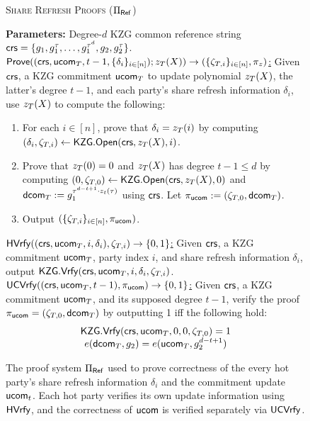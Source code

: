 \begin{figure*}[tb]
    \centering
    \begin{mdframed}
    \begin{center}
        \textsc{Share Refresh Proofs ($\Pi_{\sf Ref}$)}
    \end{center}
    \medskip
    \textbf{Parameters:} Degree-$d$ KZG common reference string $\mathsf{crs} = \{g_1, g_1^\tau, \dots, g_1^{\tau^d}, g_2, g_2^\tau\}$.
    \hfill\medskip\\
    \underline{$\mathsf{Prove}((\mathsf{crs}, {\sf u}\mathsf{com}_{T}, t-1, \{\delta_i\}_{i \in [n]}); z_{T}(X)) \to (\{\zeta_{T,i}\}_{i \in [n]}, \pi_z)$:} Given $\mathsf{crs}$, a KZG commitment ${\sf u}\mathsf{com}_{T}$ to update polynomial $z_{T}(X)$, the latter's degree $t-1$, and each party's share refresh information $\delta_i$, use $z_{T}(X)$ to compute the following:
    \begin{enumerate}
        \item For each $i \in [n]$, prove that $\delta_i = z_{T}(i)$ by computing $(\delta_i, \zeta_{T,i}) \gets \mathsf{KZG}.\mathsf{Open}(\mathsf{crs}, z_{T}(X), i)$. 
        \item Prove that $z_{T}(0) = 0$ and $z_{T}(X)$ has degree $t-1 \leq d$ by computing $(0, \zeta_{T,0}) \gets \mathsf{KZG}.\mathsf{Open}(\mathsf{crs}, z_{T}(X), 0)$ and $\mathsf{dcom}_{T} := g_1^{\tau^{d-t+1} \cdot z_t(\tau)}$ using $\mathsf{crs}$. Let $\pi_{\mathsf{ucom}} := (\zeta_{T,0}, \mathsf{dcom}_{T})$. 
        \item Output $(\{\zeta_{T,i}\}_{i \in [n]}, \pi_{\mathsf{ucom}})$.
    \end{enumerate}
    \underline{$\mathsf{H}\mathsf{Vrfy}((\mathsf{crs}, \mathsf{ucom}_{T}, i, \delta_i), \zeta_{T,i}) \to \{0,1\}$:} Given $\mathsf{crs}$, a KZG commitment $\mathsf{ucom}_{T}$, party index $i$, and share refresh information $\delta_i$, output $\mathsf{KZG}.\mathsf{Vrfy}(\mathsf{crs}, \mathsf{ucom}_{T}, i, \delta_i, \zeta_{T,i})$.\medskip\\
    \underline{${\sf UC}\mathsf{Vrfy}((\mathsf{crs}, \mathsf{ucom}_{T}, t-1), \pi_{\mathsf{ucom}}) \to \{0,1\}$:} Given $\mathsf{crs}$, a KZG commitment $\mathsf{ucom}_{T}$, and its supposed degree $t-1$, verify the proof $\pi_{\mathsf{ucom}} = (\zeta_{T,0}, \mathsf{dcom}_{T})$ by outputting 1 iff the following hold:
    \[\begin{array}{c}
        \mathsf{KZG}.\mathsf{Vrfy}(\mathsf{crs}, \mathsf{ucom}_{T}, 0, 0, \zeta_{T,0}) = 1\\
        e(\mathsf{dcom}_{T}, g_2) = e(\mathsf{ucom}_{T}, g_2^{d-t+1})
    \end{array}\]
    \end{mdframed}
    \caption{The proof system $\Pi_{\sf Ref}$ used to prove correctness of the every hot party's share refresh information $\delta_i$ and the commitment update ${\sf u}\mathsf{com}_t$. Each hot party verifies its own update information using ${\sf H}\mathsf{Vrfy}$, and the correctness of ${\sf u}\mathsf{com}$ is verified separately via ${\sf UC}\mathsf{Vrfy}$.}
    \label{fig:pi_ref}
\end{figure*}

